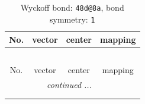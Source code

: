 \documentclass[fleqn,8pt]{jsarticle}
\begin{document}
\renewcommand{\arraystretch}{1.2}
\begin{longtable}{cccc}
\caption{Wyckoff bond: {\tt 48d@8a}, bond symmetry: {\tt 1}}
 \\
 \hline \hline
No. & vector & center & mapping \\ \hline \endfirsthead

\multicolumn{3}{l}{\tablename\ \thetable{}} \\
 \hline \hline
No. & vector & center & mapping \\ \hline \endhead

 \hline \hline
\multicolumn{3}{r}{\footnotesize\it continued ...} \\ \endfoot

 \hline \hline
\multicolumn{3}{r}{} \\ \endlastfoot


\end{longtable}
\end{document}

